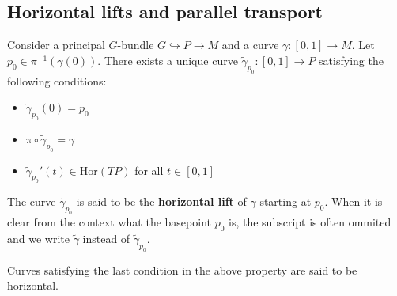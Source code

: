 \subsection{Horizontal lifts and parallel transport}
	
	\begin{property}
		Consider a principal $G$-bundle $G\hookrightarrow P\rightarrow M$ and a curve $\gamma:[0, 1]\rightarrow M$. Let $p_0\in \pi^{-1}(\gamma(0))$. There exists a unique curve $\widetilde{\gamma}_{p_0}:[0, 1]\rightarrow P$ satisfying the following conditions:
		\begin{itemize}
			\item $\widetilde{\gamma}_{p_0}(0) = p_0$
			\item $\pi\circ\widetilde{\gamma}_{p_0} = \gamma$
			\item $\widetilde{\gamma}_{p_0}'(t)\in\text{Hor}(TP)$ for all $t\in[0, 1]$
		\end{itemize}
		The curve $\widetilde{\gamma}_{p_0}$ is said to be the \textbf{horizontal lift} of $\gamma$ starting at $p_0$. When it is clear from the context what the basepoint $p_0$ is, the subscript is often ommited and we write $\widetilde{\gamma}$ instead of $\widetilde{\gamma}_{p_0}$.
	\end{property}
	\begin{remark}
		Curves satisfying the last condition in the above property are said to be horizontal.
	\end{remark}
	
